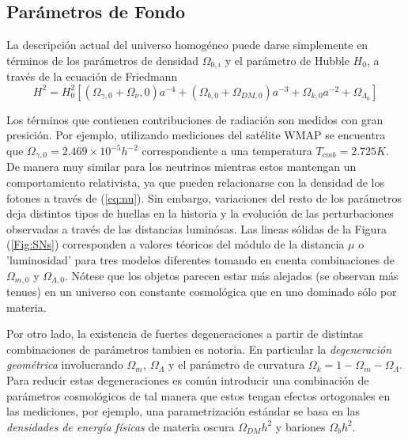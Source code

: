 \documentclass[10.5pt,prb,
               showpacs,            %
               preprintnumbers,     %
               aps,                 %
               prl,          	    %
               letterpaper,             %
               superscriptaddress,      %
               nofootinbib,         %
               tightenlines,        %
               floats,floatfix      %
               ,usenatbib]{revtex4-1}%
\def\beq{\begin{equation}}
\def\eeq{\end{equation}}
\begin{document}
\subsection*{Par\'ametros de Fondo}


La descripci\'on actual del universo homog\'eneo puede darse simplemente en t\'erminos de los par\'ametros de 
densidad $\Omega_{0,i}$ y el par\'ametro de Hubble $H_{0}$, a trav\'es de la ecuaci\'on de Friedmann
%
	\beq
		H^2 = H_0^2 \left[(\Omega_{\gamma,0} + \Omega_\nu, 0)a^{-4} + (\Omega_{b, 0} + \Omega_{DM, 0})a^{-3} 
					+ \Omega_{k,0}a^{-2} + \Omega_{\Lambda_0}\right]
	\eeq


Los t\'erminos que contienen contribuciones de radiaci\'on son medidos con gran presici\'on. Por ejemplo, utilizando  
mediciones del sat\'elite WMAP se encuentra que $\Omega_{\gamma,0} = 2.469 \times 10^{-5} h^{-2}$  correspondiente 
a una temperatura $T_{cmb}=2.725K$. 
De manera muy similar para los neutrinos mientras estos mantengan un comportamiento relativista, ya que pueden 
relacionarse con la densidad de los fotones a trav\'es de (\ref{eq:nu}). 
Sin embargo, variaciones del resto de los par\'ametros deja distintos tipos de huellas en la historia y la evoluci\'on
de las perturbaciones observadas a trav\'es de las distancias lumin\'osas.
Las lineas s\'olidas de la Figura (\ref{Fig:SNs}) corresponden a valores t\'eoricos 
del m\'odulo de la distancia $\mu$ o 'luminosidad' para tres modelos diferentes tomando en cuenta
combinaciones de $\Omega_{m,0}$ y $\Omega_{\Lambda,0}$. N\'otese que los objetos parecen estar m\'as alejados 
(se observan m\'as tenues) en un universo con constante cosmol\'ogica que en uno dominado s\'olo por materia.


Por otro lado, la existencia de fuertes degeneraciones a partir de distintas combinaciones de par\'ametros tambien es notoria.
En particular la \textit{degeneraci\'on geom\'etrica} involucrando $\Omega_m,~\Omega_\Lambda$
y el par\'ametro de curvatura $\Omega_k=1 - \Omega_m - \Omega_\Lambda$. Para reducir estas degeneraciones
es com\'un introducir una combinaci\'on de par\'ametros cosmol\'ogicos de tal manera que estos tengan efectos ortogonales
en las mediciones, por ejemplo, una parametrizaci\'on est\'andar se basa en las \textit{densidades de energ\'ia f\'isicas}
de  materia oscura $\Omega_{DM}h^2$ y bariones $\Omega_b h^2$.
\end{document}
